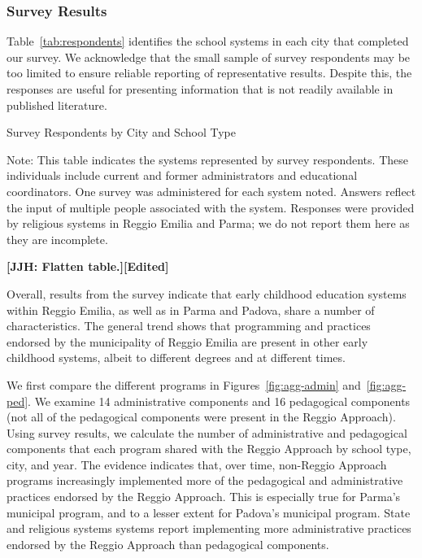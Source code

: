 \subsubsection{Survey Results}

Table~\ref{tab:respondents} identifies the school systems in each city that completed our survey. We acknowledge that the small sample of survey respondents may be too limited to ensure reliable reporting of representative results. Despite this, the responses are useful for presenting information that is not readily available in published literature.

\begin{table}[H]
\centering
\caption{Survey Respondents by City and School Type}\label{tab:respondents}
\begin{threeparttable}
	
\begin{tablenotes}
\footnotesize Note: This table indicates the systems represented by survey respondents. These individuals include current and former administrators and educational coordinators. One survey was administered for each system noted. Answers reflect the input of multiple people associated with the system. Responses were provided by religious systems in Reggio Emilia and Parma; we do not report them here as they are incomplete. \end{tablenotes}
\end{threeparttable}
\end{table}

\textbf{[JJH: Flatten table.][Edited]}

Overall, results from the survey indicate that early childhood education systems within Reggio Emilia, as well as in Parma and Padova, share a number of characteristics. The general trend shows that programming and practices endorsed by the municipality of Reggio Emilia are present in other early childhood systems, albeit to different degrees and at different times. 

We first compare the different programs in Figures~\ref{fig:agg-admin} and~\ref{fig:agg-ped}. We examine 14 administrative components and 16 pedagogical components (not all of the pedagogical components were present in the Reggio Approach). Using survey results, we calculate the number of administrative and pedagogical components that each program shared with the Reggio Approach by school type, city, and year. The evidence indicates that, over time, non-Reggio Approach programs increasingly implemented more of the pedagogical and administrative practices endorsed by the Reggio Approach. This is especially true for Parma's municipal program, and to a lesser extent for Padova's municipal program. State and religious systems systems report implementing more administrative practices endorsed by the Reggio Approach than pedagogical components. 


